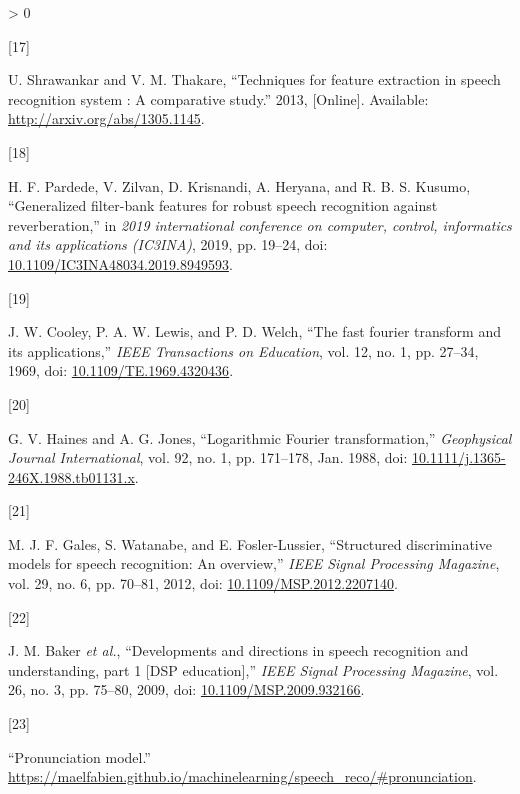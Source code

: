 \documentclass[
  a4paper,
]{article}
\newlength{\cslhangindent}
\newlength{\csllabelwidth}
\newenvironment{CSLReferences}[2] %
 {%
  \setlength{\parindent}{0pt}
  \ifodd #1 \everypar{\setlength{\hangindent}{\cslhangindent}}\ignorespaces\fi
  \ifnum #2 > 0
  \setlength{\parskip}{#2\baselineskip}
  \fi
 }%
 {}
\newcommand{\CSLLeftMargin}[1]{\parbox[t]{\csllabelwidth}{#1}}
\newcommand{\CSLRightInline}[1]{\parbox[t]{\linewidth - \csllabelwidth}{#1}\break}
\begin{document}
\begin{CSLReferences}{0}{0}
\leavevmode\hypertarget{ref-shrawankar2013techniques}{}%
\CSLLeftMargin{{[}17{]} }
\CSLRightInline{U. Shrawankar and V. M. Thakare, {``Techniques for
feature extraction in speech recognition system : A comparative
study.''} 2013, {[}Online{]}. Available:
\url{http://arxiv.org/abs/1305.1145}.}

\leavevmode\hypertarget{ref-8949593}{}%
\CSLLeftMargin{{[}18{]} }
\CSLRightInline{H. F. Pardede, V. Zilvan, D. Krisnandi, A. Heryana, and
R. B. S. Kusumo, {``Generalized filter-bank features for robust speech
recognition against reverberation,''} in \emph{2019 international
conference on computer, control, informatics and its applications
(IC3INA)}, 2019, pp. 19--24, doi:
\href{https://doi.org/10.1109/IC3INA48034.2019.8949593}{10.1109/IC3INA48034.2019.8949593}.}

\leavevmode\hypertarget{ref-4320436}{}%
\CSLLeftMargin{{[}19{]} }
\CSLRightInline{J. W. Cooley, P. A. W. Lewis, and P. D. Welch, {``The
fast fourier transform and its applications,''} \emph{IEEE Transactions
on Education}, vol. 12, no. 1, pp. 27--34, 1969, doi:
\href{https://doi.org/10.1109/TE.1969.4320436}{10.1109/TE.1969.4320436}.}

\leavevmode\hypertarget{ref-logft}{}%
\CSLLeftMargin{{[}20{]} }
\CSLRightInline{G. V. Haines and A. G. Jones, {``{Logarithmic Fourier
transformation},''} \emph{Geophysical Journal International}, vol. 92,
no. 1, pp. 171--178, Jan. 1988, doi:
\href{https://doi.org/10.1111/j.1365-246X.1988.tb01131.x}{10.1111/j.1365-246X.1988.tb01131.x}.}

\leavevmode\hypertarget{ref-6296527}{}%
\CSLLeftMargin{{[}21{]} }
\CSLRightInline{M. J. F. Gales, S. Watanabe, and E. Fosler-Lussier,
{``Structured discriminative models for speech recognition: An
overview,''} \emph{IEEE Signal Processing Magazine}, vol. 29, no. 6, pp.
70--81, 2012, doi:
\href{https://doi.org/10.1109/MSP.2012.2207140}{10.1109/MSP.2012.2207140}.}

\leavevmode\hypertarget{ref-4815544}{}%
\CSLLeftMargin{{[}22{]} }
\CSLRightInline{J. M. Baker \emph{et al.}, {``Developments and
directions in speech recognition and understanding, part 1 {[}DSP
education{]},''} \emph{IEEE Signal Processing Magazine}, vol. 26, no. 3,
pp. 75--80, 2009, doi:
\href{https://doi.org/10.1109/MSP.2009.932166}{10.1109/MSP.2009.932166}.}

\leavevmode\hypertarget{ref-pronun}{}%
\CSLLeftMargin{{[}23{]} }
\CSLRightInline{{``Pronunciation model.''}
\url{https://maelfabien.github.io/machinelearning/speech_reco/\#pronunciation}.}


\end{CSLReferences}
\end{document}
